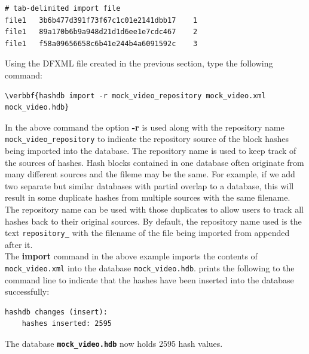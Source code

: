 \documentclass[11pt,fleqn]{article} %
\begin{document}
\lstset{style=customfile}
\begin{lstlisting}[float, caption={Example content of a tab-delimited import file}, label=importTabFile]
# tab-delimited import file
file1	3b6b477d391f73f67c1c01e2141dbb17	1
file1	89a170b6b9a948d21d1d6ee1e7cdc467	2
file1	f58a09656658c6b41e244b4a6091592c	3
\end{lstlisting}


Using the DFXML file created in the previous section, type the following command:
\begin{Verbatim}[commandchars=\\\{\}]
\verbbf{hashdb import -r mock_video_repository mock_video.xml mock_video.hdb}
\end{Verbatim}
In the above command the option \textbf{-r} is used along with the repository name \texttt{mock\_video\_repository} to indicate the repository source of the block hashes being imported into the database. The repository name is used to keep track of the sources of hashes. Hash blocks contained in one database often originate from many different sources and the fileme may be the same. For example, if we add two separate but similar databases with partial overlap to a database, this will result in some duplicate hashes from multiple sources with the same filename. The repository name can be used with those duplicates to allow users to track all hashes back to their original sources. By default, the repository name used is the text \texttt{repository\_} with the filename of the file being imported from appended after it.\\

The \textbf{import} command in the above example imports the contents of \texttt{mock\_video.xml} into the database \texttt{mock\_video.hdb}. \hash prints the following to the command line to indicate that the hashes have been inserted into the database successfully: 

\begingroup
\footnotesize
\begin{Verbatim}[fontfamily=courier]
hashdb changes (insert):
    hashes inserted: 2595
\end{Verbatim}
\endgroup
The database \texttt{\textbf{mock\_video.hdb}} now holds 2595 hash values.
\end{document}
